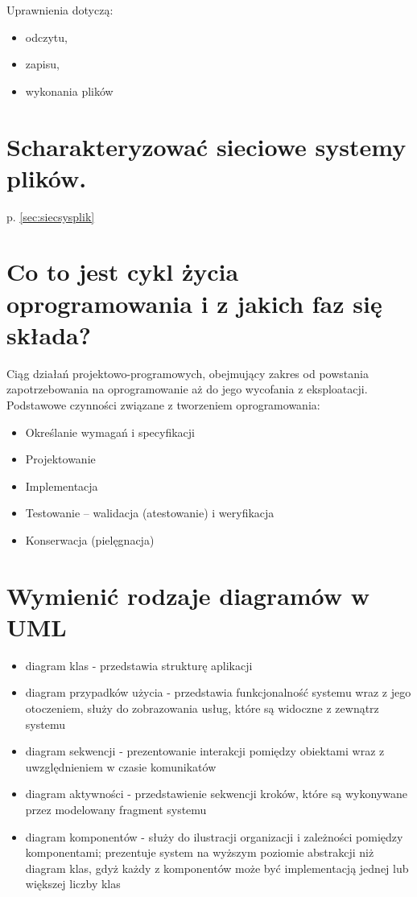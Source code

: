 \documentclass[12pt,a4paper]{article}
\begin{document}
	Uprawnienia dotyczą:
	\begin{itemize}
		\item odczytu,
		\item zapisu,
		\item wykonania plików
	\end{itemize}

	\section{Scharakteryzować sieciowe systemy plików.}
	p. \ref{sec:siecsysplik}

	\section{Co to jest cykl życia oprogramowania i z jakich faz się składa?}
	Ciąg działań projektowo-programowych, obejmujący zakres od powstania zapotrzebowania na oprogramowanie aż do jego wycofania z eksploatacji. Podstawowe czynności związane z tworzeniem oprogramowania:
	\begin{itemize}
		\item Określanie wymagań i specyfikacji
		\item Projektowanie
		\item Implementacja
		\item Testowanie – walidacja (atestowanie) i weryfikacja
		\item Konserwacja (pielęgnacja)
	\end{itemize}

	\section{Wymienić rodzaje diagramów w UML}
	\begin{itemize}
		\item diagram klas - przedstawia strukturę aplikacji
		\item diagram przypadków użycia - przedstawia funkcjonalność systemu wraz z jego otoczeniem, służy do zobrazowania usług, które są widoczne z zewnątrz systemu
		\item diagram sekwencji - prezentowanie interakcji pomiędzy obiektami wraz z uwzględnieniem w czasie komunikatów
		\item diagram aktywności - przedstawienie sekwencji kroków, które są wykonywane przez modelowany fragment systemu
		\item diagram komponentów - służy do ilustracji organizacji i zależności pomiędzy komponentami; prezentuje system na wyższym poziomie abstrakcji niż diagram klas, gdyż każdy z komponentów może być implementacją jednej lub większej liczby klas
	\end{itemize}
\end{document}
